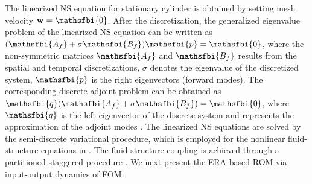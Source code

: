 \documentclass[standard]{jfm}
\newcommand{\bw}{\mathbf{w}}
\begin{document}
The linearized NS equation for stationary cylinder is obtained 
by setting mesh velocity $\bw=\mathsfbi{0}$. 
After the discretization, the generalized eigenvalue problem of the linearized 
NS equation can be written as
$(\mathsfbi{A_f} + \sigma \mathsfbi{B_f}) \mathsfbi{p} =\mathsfbi{0}$, 
where the non-symmetric matrices $\mathsfbi{A_f}$ and $\mathsfbi{B_f}$ 
results from the spatial and temporal discretizations, 
$\sigma$ denotes the eigenvalue of the discretized system,
$\mathsfbi{p}$ is the right eigenvectors (forward modes). 
The corresponding discrete adjoint problem can be obtained as
$\mathsfbi{q} (\mathsfbi{A_f} + \sigma \mathsfbi{B_f})  =\mathsfbi{0}$, 
where $\mathsfbi{q}$ is the left eigenvector of the discrete system 
and represents the approximation of the adjoint modes \citep{Luchini2007}. 
% 
The linearized NS equations are solved by the semi-discrete 
variational procedure,  which is employed for the nonlinear 
fluid-structure equations in \citep{Liu2014,Jaiman2015}.  
The fluid-structure coupling is achieved 
through a partitioned staggered procedure \citep{Jaiman2011}. 
We next present the ERA-based ROM via input-output dynamics of FOM. 

\end{document}
